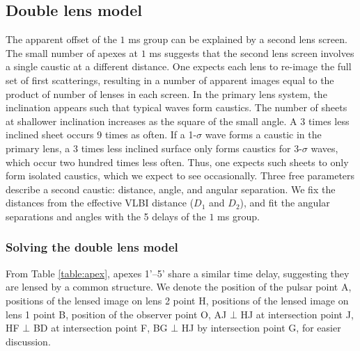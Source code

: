 \documentclass[useAMS,usenatbib]{mn2e}
\begin{document}
\subsection{Double lens model}
\label{doublelensmodel}

The apparent offset of the $1$ ms group can be explained by a second lens
screen.  The small number of apexes at $1$ ms suggests that the second
lens screen involves a single caustic at a different distance.  One
expects each lens to re-image the full set of first scatterings,
resulting in a number of apparent images equal to the product of
number of lenses in each screen.
In the
primary lens system, the inclination appears such that typical waves
form caustics.  The number of sheets at shallower inclination
increases as the square of the small angle.  A 3 times less inclined
sheet occurs 9 times as often.  If a 1-$\sigma$ wave forms a caustic
in the primary lens, a 3 times less inclined surface only forms
caustics for 3-$\sigma$ waves, which occur two hundred times less
often.  Thus, one expects such sheets to only form isolated caustics,
which we expect to see occasionally.  Three free parameters describe a
second caustic: distance, angle, and angular separation.  We fix the
distances from the effective VLBI distance ($D_1$ and $D_2$), and fit the angular
separations and angles with the 5 delays of the $1$ ms group.

\subsubsection{Solving the double lens model}
From Table \ref{table:apex}, apexes 1'--5' share a similar time delay, suggesting they are lensed by
a common structure.
We denote the position of the pulsar point A, positions of the lensed image on lens 2 point H, positions of the lensed image on lens 1 point B, position of the observer point O, AJ $\bot$ HJ at intersection point J, HF $\bot$ BD at intersection point F, BG $\bot$ HJ by intersection point G, for easier discussion.
\end{document}

